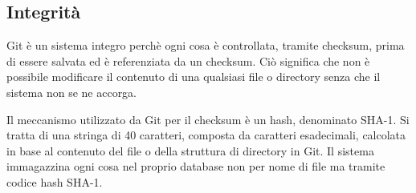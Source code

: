 \subsection{Integrità}
Git è un sistema integro perchè ogni cosa è controllata, tramite checksum, prima di essere salvata ed è referenziata da un checksum. Ciò significa che non è possibile modificare il contenuto di una qualsiasi file o directory senza che il sistema non se ne accorga. 

Il meccanismo utilizzato da Git per il checksum è un hash, denominato SHA-1. Si tratta di una stringa di 40 caratteri, composta da caratteri esadecimali, calcolata in base al contenuto del file o della struttura di directory in Git. Il sistema immagazzina ogni cosa nel proprio database non per nome di file ma tramite codice hash SHA-1.